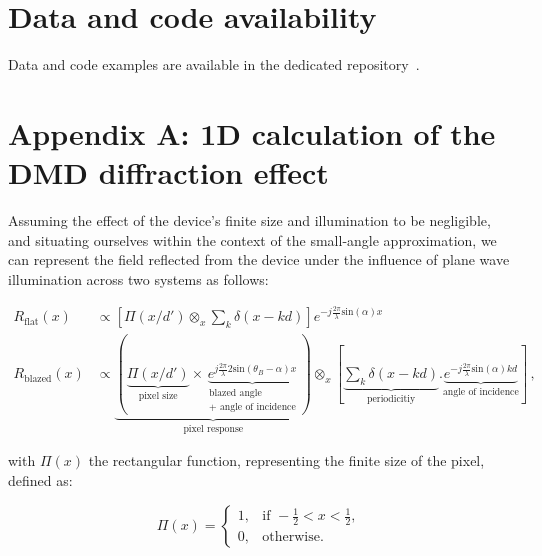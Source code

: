 \documentclass[12pt]{iopart}
\begin{document}

\section*{Data and code availability}

\noindent Data and code examples are available in the dedicated repository~\cite{github}.


\section*{Appendix A: 1D calculation of the DMD diffraction effect}
\label{app:1D}


Assuming the effect of the device's finite size and illumination to be negligible,
and situating ourselves within the context of the small-angle approximation,
we can represent the field reflected from the device
under the influence of plane wave illumination
across two systems as follows:


\begin{equation}
  \begin{aligned}
    R_\text{flat}(x)   & \propto \left[\Pi\left(x/d'\right) \otimes_x \sum_k \delta(x-k d)\right]e^{-j\frac{2\pi}{\lambda}\text{sin}(\alpha) x} \\
    R_\text{blazed}(x) & \propto
    \underbrace{
      \left(
      \underbrace{\Pi\left(x/d'\right)}_\text{pixel size}
      \times
    \underbrace{e^{j\frac{2\pi}{\lambda}2\text{sin}(\theta_B-\alpha) x}}_{\substack{\text{blazed angle}                                         \\ \text{+ angle of incidence}}}
      \right)
    }_\text{pixel response}
    \otimes_x
    \left[
      \underbrace{\sum_k \delta(x-k d) }_\text{periodicitiy}
      .
      \underbrace{
        e^{-j\frac{2\pi}{\lambda}\text{sin}(\alpha) kd}
      }_\text{angle of incidence}
      \right]
    \, ,
  \end{aligned}
  \label{eq:grating_response}
\end{equation}

with $\Pi(x)$ the rectangular function,
representing the finite size of the pixel,
defined as:

\begin{equation}
  \Pi(x) =
  \begin{cases}
    1, & \text{if } -\frac{1}{2} < x < \frac{1}{2}, \\
    0, & \text{otherwise}.
  \end{cases}
\end{equation}
\end{document}
